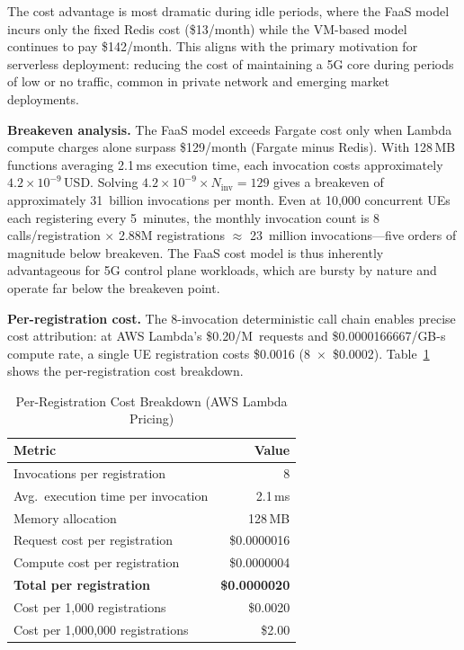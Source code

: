 \documentclass[conference]{IEEEtran}
\begin{document}
The cost advantage is most dramatic during idle periods, where the FaaS model incurs only the fixed Redis cost (\$13/month) while the VM-based model continues to pay \$142/month. This aligns with the primary motivation for serverless deployment: reducing the cost of maintaining a 5G core during periods of low or no traffic, common in private network and emerging market deployments.

\textbf{Breakeven analysis.} The FaaS model exceeds Fargate cost only when Lambda compute charges alone surpass \$129/month (Fargate minus Redis). With 128\,MB functions averaging 2.1\,ms execution time, each invocation costs approximately $4.2 \times 10^{-9}$\,USD. Solving $4.2 \times 10^{-9} \times N_{\text{inv}} = 129$ gives a breakeven of approximately 31~billion invocations per month. Even at 10{,}000 concurrent UEs each registering every 5~minutes, the monthly invocation count is 8 calls/registration $\times$ 2.88M registrations $\approx$ 23~million invocations---five orders of magnitude below breakeven. The FaaS cost model is thus inherently advantageous for 5G control plane workloads, which are bursty by nature and operate far below the breakeven point.

\textbf{Per-registration cost.} The 8-invocation deterministic call chain enables precise cost attribution: at AWS Lambda's \$0.20/M~requests and \$0.0000166667/GB-s compute rate, a single UE registration costs \$0.0016 (8~$\times$~\$0.0002). Table~\ref{tab:per-reg-cost} shows the per-registration cost breakdown.

\begin{table}[t]
\centering
\caption{Per-Registration Cost Breakdown (AWS Lambda Pricing)}
\label{tab:per-reg-cost}
\footnotesize
\begin{tabular}{@{}lr@{}}
\toprule
\textbf{Metric} & \textbf{Value} \\
\midrule
Invocations per registration & 8 \\
Avg.\ execution time per invocation & 2.1\,ms \\
Memory allocation & 128\,MB \\
\midrule
Request cost per registration & \$0.0000016 \\
Compute cost per registration & \$0.0000004 \\
\textbf{Total per registration} & \textbf{\$0.0000020} \\
\midrule
Cost per 1{,}000 registrations & \$0.0020 \\
Cost per 1{,}000{,}000 registrations & \$2.00 \\
\bottomrule
\end{tabular}
\end{table}
\end{document}
